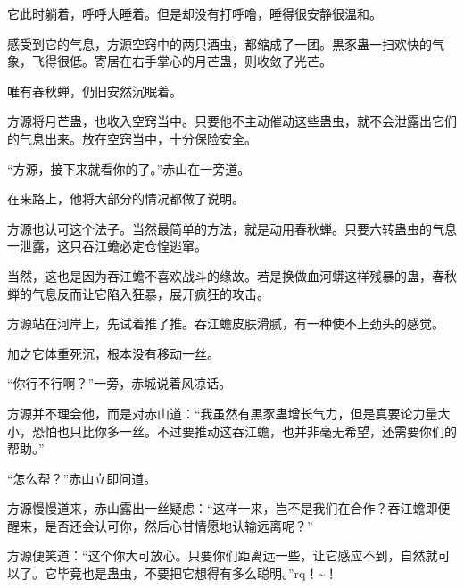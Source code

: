 \begin{this_body}
它此时躺着，呼呼大睡着。但是却没有打呼噜，睡得很安静很温和。

感受到它的气息，方源空窍中的两只酒虫，都缩成了一团。黒豕蛊一扫欢快的气象，飞得很低。寄居在右手掌心的月芒蛊，则收敛了光芒。

唯有春秋蝉，仍旧安然沉眠着。

方源将月芒蛊，也收入空窍当中。只要他不主动催动这些蛊虫，就不会泄露出它们的气息出来。放在空窍当中，十分保险安全。

“方源，接下来就看你的了。”赤山在一旁道。

在来路上，他将大部分的情况都做了说明。

方源也认可这个法子。当然最简单的方法，就是动用春秋蝉。只要六转蛊虫的气息一泄露，这只吞江蟾必定仓惶逃窜。

当然，这也是因为吞江蟾不喜欢战斗的缘故。若是换做血河蟒这样残暴的蛊，春秋蝉的气息反而让它陷入狂暴，展开疯狂的攻击。

方源站在河岸上，先试着推了推。吞江蟾皮肤滑腻，有一种使不上劲头的感觉。

加之它体重死沉，根本没有移动一丝。

“你行不行啊？”一旁，赤城说着风凉话。

方源并不理会他，而是对赤山道：“我虽然有黒豕蛊增长气力，但是真要论力量大小，恐怕也只比你多一丝。不过要推动这吞江蟾，也并非毫无希望，还需要你们的帮助。”

“怎么帮？”赤山立即问道。

方源慢慢道来，赤山露出一丝疑虑：“这样一来，岂不是我们在合作？吞江蟾即便醒来，是否还会认可你，然后心甘情愿地认输远离呢？”

方源便笑道：“这个你大可放心。只要你们距离远一些，让它感应不到，自然就可以了。它毕竟也是蛊虫，不要把它想得有多么聪明。”rq！\~{}！

\end{this_body}

